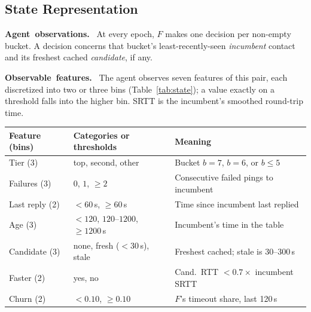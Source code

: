 \documentclass[9pt,twocolumn]{extarticle}
\newcommand{\inl}[1]{\mbox{\textbf{#1.}}\ }
\begin{document}
\subsection{State Representation}
\inl{Agent observations} At every epoch, $F$ makes one decision per non-empty bucket. A decision concerns that bucket's least-recently-seen \emph{incumbent} contact and its freshest cached \emph{candidate}, if any.

\inl{Observable features} The agent observes seven features of this pair, each discretized into two or three bins (Table~\ref{tab:state}); a value exactly on a threshold falls into the higher bin. SRTT is the incumbent's smoothed round-trip time.

\par\smallskip\noindent\begin{minipage}{\columnwidth}
\centering\footnotesize
{}
\label{tab:state}
\setlength{\tabcolsep}{3pt}
\renewcommand{\arraystretch}{1.05}
\begin{tabular}{@{}>{\raggedright\arraybackslash}p{1.45cm} >{\raggedright\arraybackslash}p{2.95cm} >{\raggedright\arraybackslash}p{3.9cm}@{}}
\toprule
Feature (bins) & Categories or thresholds & Meaning\\
\midrule
Tier (3) & top, second, other & Bucket $b=7$, $b=6$, or $b\le5$\\
Failures (3) & $0$, $1$, $\ge 2$ & Consecutive failed pings to incumbent\\
Last reply (2) & $<60$\,s, $\ge 60$\,s & Time since incumbent last replied\\
Age (3) & $<120$, $120$--$1200$, $\ge 1200$\,s & Incumbent's time in the table\\
Candidate (3) & none, fresh ($<30$\,s), stale & Freshest cached; stale is 30--300\,s\\
Faster (2) & yes, no & Cand.\ RTT $<0.7\times$ incumbent SRTT\\
Churn (2) & $<0.10$, $\ge 0.10$ & $F$'s timeout share, last 120\,s\\
\bottomrule
\end{tabular}
\end{minipage}\par\smallskip
\end{document}
